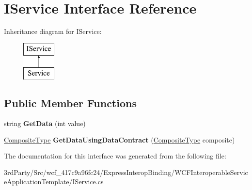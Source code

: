 \hypertarget{interface_i_service}{\section{I\-Service Interface Reference}
\label{interface_i_service}
}
Inheritance diagram for I\-Service\-:\begin{figure}[H]
\begin{center}
\leavevmode
\includegraphics[height=2.000000cm]{interface_i_service}
\end{center}
\end{figure}
\subsection*{Public Member Functions}
\begin{DoxyCompactItemize}
\item 
\hypertarget{interface_i_service_a2826e54fa42939f266f82df66c1dad53}{string {\bfseries Get\-Data} (int value)}\label{interface_i_service_a2826e54fa42939f266f82df66c1dad53}

\item 
\hypertarget{interface_i_service_ad8db1ed672b7b87404f61c3a87fd0bb9}{\hyperlink{class_composite_type}{Composite\-Type} {\bfseries Get\-Data\-Using\-Data\-Contract} (\hyperlink{class_composite_type}{Composite\-Type} composite)}\label{interface_i_service_ad8db1ed672b7b87404f61c3a87fd0bb9}

\end{DoxyCompactItemize}


The documentation for this interface was generated from the following file\-:\begin{DoxyCompactItemize}
\item 
3rd\-Party/\-Src/wcf\-\_\-417c9a96fc24/\-Express\-Interop\-Binding/\-W\-C\-F\-Interoperable\-Service\-Application\-Template/I\-Service.\-cs\end{DoxyCompactItemize}
